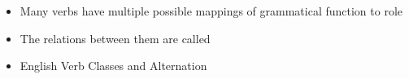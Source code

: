 \documentclass[a4paper,landscape,headrule,footrule,xetex]{foils}
\begin{document}


\begin{itemize}
\item  Many verbs have multiple possible mappings of grammatical function to role
  \begin{exe}
    \ex
    \begin{xlist}
      \ex{}
      \ex{}
      \ex{}
    \end{xlist}
    \ex
    \begin{xlist}
      \ex{}
      \ex{}
    \end{xlist}
  \end{exe}  
\item  The relations between them are called 
\item  English Verb Classes and Alternation \citep{Levin:1993}
\end{itemize}
\end{document}
